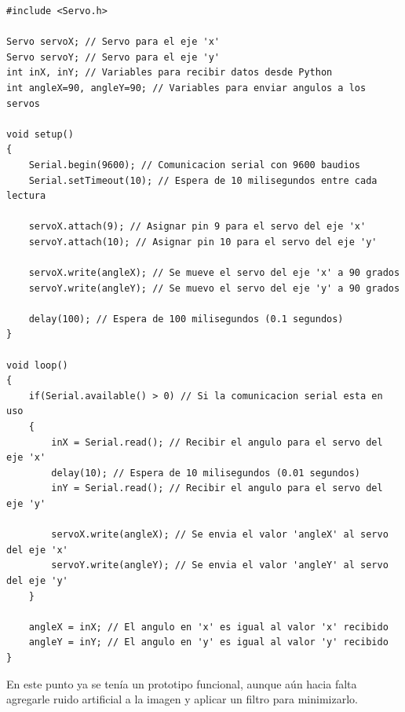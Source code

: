 \documentclass[12pt, oneside]{article}
\begin{document}
{    \begin{lstlisting}[style=arduinoScript]
#include <Servo.h>

Servo servoX; // Servo para el eje 'x'
Servo servoY; // Servo para el eje 'y'
int inX, inY; // Variables para recibir datos desde Python
int angleX=90, angleY=90; // Variables para enviar angulos a los servos

void setup()
{
    Serial.begin(9600); // Comunicacion serial con 9600 baudios
    Serial.setTimeout(10); // Espera de 10 milisegundos entre cada lectura

    servoX.attach(9); // Asignar pin 9 para el servo del eje 'x'
    servoY.attach(10); // Asignar pin 10 para el servo del eje 'y'

    servoX.write(angleX); // Se mueve el servo del eje 'x' a 90 grados
    servoY.write(angleY); // Se muevo el servo del eje 'y' a 90 grados

    delay(100); // Espera de 100 milisegundos (0.1 segundos)
}

void loop()
{
    if(Serial.available() > 0) // Si la comunicacion serial esta en uso
    {
        inX = Serial.read(); // Recibir el angulo para el servo del eje 'x'
        delay(10); // Espera de 10 milisegundos (0.01 segundos)
        inY = Serial.read(); // Recibir el angulo para el servo del eje 'y'

        servoX.write(angleX); // Se envia el valor 'angleX' al servo del eje 'x'
        servoY.write(angleY); // Se envia el valor 'angleY' al servo del eje 'y'
    }

    angleX = inX; // El angulo en 'x' es igual al valor 'x' recibido
    angleY = inY; // El angulo en 'y' es igual al valor 'y' recibido
}
    \end{lstlisting}

    \hspace{0.5cm} En este punto ya se tenía un prototipo funcional, aunque aún hacia
    falta agregarle ruido artificial a la imagen y aplicar un filtro para minimizarlo.

}
\end{document}
